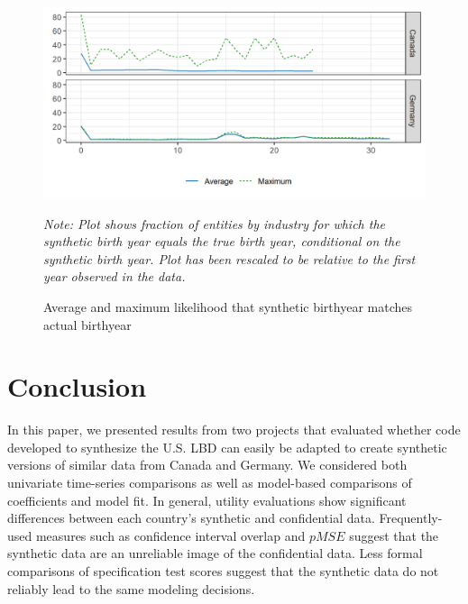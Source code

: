 \documentclass[10pt,twoside]{article}
\begin{document}
\begin{figure}[ht]
\includegraphics[width=\linewidth]{r-graphs/fig_conf_both.png}
\caption{Average and maximum likelihood that synthetic birthyear matches actual birthyear\label{fig:Conf.Both}}

\begin{center}
\begin{minipage}{0.8\linewidth}
	\footnotesize \it
Note: Plot shows fraction of entities by industry for which the synthetic birth year equals the true birth year, conditional on the synthetic birth year. Plot has been rescaled to be relative to the first year observed in the data.	
\end{minipage}
\end{center}
\end{figure} 



 
\section{Conclusion}
\label{sec:conclusion}

In this paper, we presented results from two projects that evaluated whether code developed to synthesize the U.S. LBD can easily be adapted to create synthetic versions of similar data from Canada and Germany. We considered both univariate time-series comparisons as well as model-based comparisons of coefficients and model fit. In general, utility evaluations show significant differences between each country's synthetic and confidential data. Frequently-used measures such as confidence interval overlap and $pMSE$ suggest that the synthetic data are an unreliable image of the confidential data. Less formal comparisons of specification test scores suggest that the synthetic data do not reliably lead to  the same modeling decisions.
\end{document}
